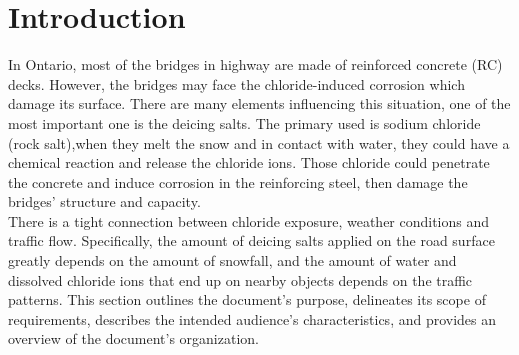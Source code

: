 \documentclass[12pt]{article}
\begin{document}





\section{Introduction}
In Ontario, most of the bridges in highway are made of reinforced concrete (RC) decks. However, the bridges may face the chloride-induced corrosion which damage its surface. There are many elements influencing this situation, one of the most important one is the deicing salts. The primary used is sodium chloride (rock salt),when they melt the snow and in contact with water, they could have a chemical reaction and release the chloride ions. Those chloride could penetrate the concrete and induce corrosion in the reinforcing steel, then damage the bridges’ structure and capacity. \\
There is a tight connection between chloride exposure, weather conditions and traffic flow. Specifically, the amount of deicing salts applied on the road surface greatly depends on the amount of snowfall, and the amount of water and dissolved chloride ions that end up on nearby objects depends on the traffic patterns. This section outlines the document's purpose, delineates its scope of requirements, describes the intended audience's characteristics, and provides an overview of the document's organization.
\end{document}
